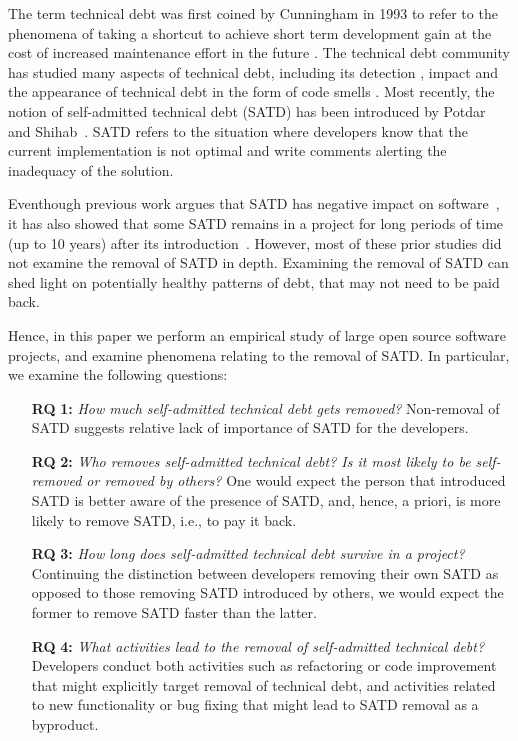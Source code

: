 
The term technical debt was first coined by Cunningham in 1993 to refer to the phenomena of taking a shortcut to achieve short term development gain at the cost of increased maintenance effort in the future \cite{Cunningham1992WPM}. The technical debt community has studied many aspects of technical debt, including its detection \cite{Zazworka2013EASE}, impact \cite{Zazworka2011MTD} and the appearance of technical debt in the form of code smells \cite{Fontana2012MTD}. 
Most recently, the notion of self-admitted technical debt (SATD) has been introduced by Potdar and Shihab~\cite{Potdar2014ICSME}.
SATD refers to the situation where developers know that the current implementation is not optimal and write comments alerting the inadequacy of the solution.




Eventhough previous work argues that SATD has negative impact on software~\cite{Wehaibi2016SANER,kameiusingTDA2016}, it has also showed that some SATD remains in a project for long periods of time (up to 10 years) after its introduction~\cite{Potdar2014ICSME}. However, most of these prior studies did not examine the removal of SATD in depth. Examining the removal of SATD can shed light on potentially healthy patterns of debt, that may not need to be paid back.


Hence, in this paper we perform an empirical study of large open source software projects, and examine phenomena relating to the removal of SATD. In particular, we examine the following questions:
\begin{itemize}
	\item[\textbf{RQ}]\textbf{1:} \emph{How much self-admitted technical debt gets removed?} Non-removal of SATD suggests relative lack of importance of SATD for the developers. 
	\item[\textbf{RQ}]\textbf{2:} \emph{Who removes self-admitted technical debt? Is it most likely to be self-removed or removed by others?} One would expect the person that introduced SATD is better aware of the presence of SATD, and, hence, a priori, is more likely to remove SATD, i.e., to pay it back.
	\item[\textbf{RQ}]\textbf{3:} \emph{How long does self-admitted technical debt survive in a project?} Continuing the distinction between developers removing their own SATD as opposed to those removing SATD introduced by others, we would expect the former to remove SATD faster than the latter.
	\item[\textbf{RQ}]\textbf{4:} \emph{What activities lead to the removal of self-admitted technical debt?} Developers conduct both activities such as refactoring or code improvement that might explicitly target removal of technical debt, and activities related to new functionality or bug fixing that might lead to SATD removal as a byproduct.
\end{itemize}


